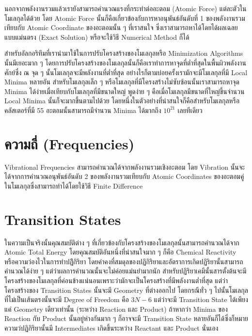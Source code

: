 นอกจากพลังงานรวมแล้วเรายังสามารถคำนวณแรงที่กระทำต่ออะตอม (Atomic Force) แต่ละตัวในโมเลกุลได้ด้วย โดย Atomic Force นั้นก็คือเกี่ยวข้องกับการหาอนุพันธ์อันดับที่ 1 ของพลังงานรวมเทียบกับ Atomic Coordinate ของอะตอมนั้น ๆ ที่เราสนใจ ซึ่งเราสามารถหาได้โดยได้ผลเฉลยแบบแม่นตรง (Exact Solution) หรือจะใช้วิธี Numerical Method ก็ได้

สำหรับอัลกอริทึมที่เรานำมาใช้ในการปรับโครงสร้างของโมเลกุลหรือ Minimization Algorithms นั้นมีเยอะมาก ๆ โดยการปรับโครงสร้างของโมเลกุลนั้นก็คือเราทำการหาจุดที่ต่ำที่สุดในพื้นผิวพลังงานศักย์ซึ่ง ณ จุด ๆ นั้นโมเลกุลจะมีพลังงานที่ต่ำที่สุด อย่างไรก็ตามบ่อยครั้งเรามักจะมีโมเลกุลที่มี Local Minima หลายอัน สำหรับโมเลกุลเล็ก ๆ หรือโมเลกุลที่มีโครงสร้างไม่ซับซ้อนนั้นเราสามารถหาจุด Minima ได้ง่ายเมื่อเทียบกับโมเลกุลที่มีขนาดใหญ่ พูดง่าย ๆ คือเมื่อโมเลกุลมีขนาดที่ใหญ่ขึ้นจำนวน Local Minima นั้นก็จะมากขึ้นตามไปด้วย โดยหนึ่งในตัวอย่างที่น่าสนใจก็คือสำหรับโมเลกุลหรือคลัสเตอร์ที่มี 55 อะตอมนั้นสามารถมีจำนวน Minima ได้มากถึง $10^{21}$ เลยทีเดียว

\section{ความถี่ (Frequencies)}

Vibrational Frequencies สามารถคำนวณได้จากพลังงานรวมเชิงอะตอม โดย Vibration นั้นจะได้จากการคำนวณอนุพันธ์อันดับ 2 ของพลังงานรวมเทียบกับ Atomic Coordinates ของอะตอมคู่ในโมเลกุลซึ่งสามารถทำได้โดยใช้วิธี Finite Difference 

\section{Transition States}

ในความเป็นจริงนั้นคุณสมบัติต่าง ๆ ที่เกี่ยวข้องกับโครงสร้างของโมเลกุลนั้นสามารถคำนวณได้จาก Atomic Total Energy โดยคุณสมบัติอันหนึ่งที่น่าสนใจมาก ๆ ก็คือ Chemical Reactivity หรือความว่องไวในการทำปฏิิกิริยา โดยค่าคงที่สมดุลของปฏิกิริยาและอัตราการเกิดปฏิริยานั้นสามารถคำนวณได้ง่าย ๆ แต่ว่าผลการคำนวณนั้นจะไม่ค่อยแม่นยำมากนัก สำหรับปฏิริยาเคมีนั้นสารตั้งต้นจะมีโครงสร้างของโมเลกุลที่ค่อนข้างแน่นอนเพราะว่ามักจะเป็นโครงสร้างที่มีพลังงานต่ำที่สุด แต่ว่าโครงสร้างของ Transition States นั้นจะมี Geometry ที่ต่างออกไป โดยกรณีทั่ว ๆ ไปนั้นโมเลกุลที่ไม่เป็นเส้นตรงนั้นจะมี Degree of Freedom คือ $3N - 6$ แต่ว่าจะมี Transition State ได้เพียงแค่ Geometry เดียวเท่านั้น (ระหว่าง Reaction และ Product) ถ้าหากว่า Minima ของ Reaction กับ Product นั้นอยู่ห่างกันมาก ๆ ก็อาจจะมี Transition State หลายอันก็ได้ซึ่งก็หมายความว่ปฏิกิริยานั้นมี Intermediates เกิดขึ้นระหว่าง Reactant และ Product นั่นเอง 

